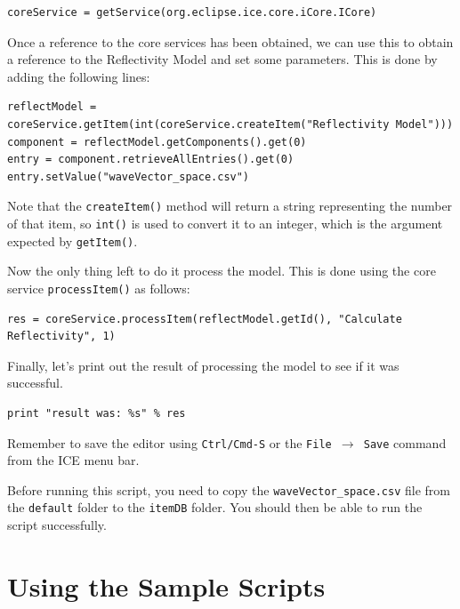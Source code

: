 {\small
\begin{verbatim}
coreService = getService(org.eclipse.ice.core.iCore.ICore)
\end{verbatim}
}

Once a reference to the core services has been obtained, we can use this to
obtain a reference to the Reflectivity Model and set some parameters. This is
done by adding the following lines:

{\small
\begin{verbatim}
reflectModel = coreService.getItem(int(coreService.createItem("Reflectivity Model")))
component = reflectModel.getComponents().get(0)
entry = component.retrieveAllEntries().get(0)
entry.setValue("waveVector_space.csv")
\end{verbatim}
}

Note that the \texttt{createItem()} method will return a string representing the
number of that item, so \texttt{int()} is used to convert it to an integer, which is the
argument expected by \texttt{getItem()}.

Now the only thing left to do it process the model. This is done using the core
service \texttt{processItem()} as follows:

{\small
\begin{verbatim}
res = coreService.processItem(reflectModel.getId(), "Calculate Reflectivity", 1)
\end{verbatim}
}

Finally, let's print out the result of processing the model to see if it was
successful.

{\small
\begin{verbatim}
print "result was: %s" % res
\end{verbatim}
}

Remember to save the editor using \texttt{Ctrl/Cmd-S} or the \texttt{File
$\rightarrow$ Save} command from the ICE menu bar.

Before running this script, you need to copy the \texttt{waveVector\_space.csv}
file from the \texttt{default} folder to the \texttt{itemDB} folder. You should
then be able to run the script successfully.

\section{Using the Sample Scripts}

\lstset{basicstyle=\ttfamily\scriptsize, breaklines}
\makeatletter
\def\lst@lettertrue{\let\lst@ifletter\iffalse}
\makeatother


